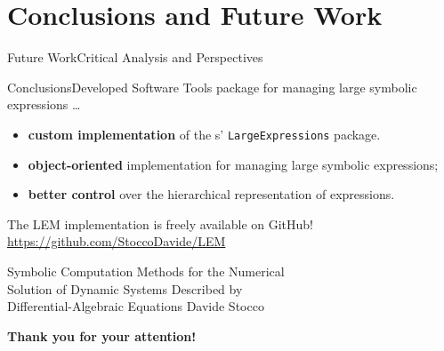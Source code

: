
\section{Conclusions and Future Work}

\begin{frame}{Future Work}{Critical Analysis and Perspectives}
\end{frame}

\begin{frame}{Conclusions}{Developed Software Tools}
  \Maple{} package for managing large symbolic expressions \dots
  \begin{itemize}
    \item \textbf{custom implementation} of the \Maple{}s' \texttt{LargeExpressions} package.
    \item \textbf{object-oriented} implementation for managing large symbolic expressions;
    \item \textbf{better control} over the hierarchical representation of expressions.
  \end{itemize}
  \begin{bbox}
    The LEM implementation is freely available on GitHub! \\
    \centering \url{https://github.com/StoccoDavide/LEM}
  \end{bbox}
\end{frame}

\begin{frame}{%
  Symbolic Computation Methods for the Numerical \\
  Solution of Dynamic Systems Described by \\
  Differential-Algebraic Equations
  }{Davide Stocco}
  \vfill
  \raggedright{\selectfont\Huge\color{tx_sl_color}\bfseries{Thank you for your attention!}} \\[0.5em]
\end{frame}

